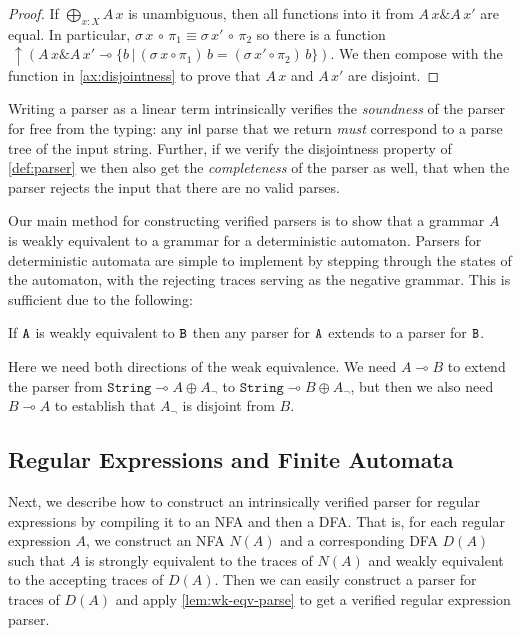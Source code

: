 \documentclass[acmsmall,nonacm]{acmart}
\newcommand{\inl}{\mathsf{inl}}
\newcommand{\lto}{\multimap}
\newcommand{\StringGram}{\texttt{String}}
\newcommand{\ltonl}[1]{~\uparrow #1}
\newcommand{\applto}[2]{#1 \, #2}
\newcommand{\LinSigTy}[3]{\textstyle\bigoplus_{#1 : #2} #3}
\newcommand{\equalizer}[3]{\{#1\,|\,\applto {#2}{#1} = \applto{#3}{#1} \}}
\newcommand{\agdalogo}{%
  \usebox{\logoagdabox}}%
\newcommand{\zenodolink}{https://zenodo.org/records/15049780}
\newcommand{\Agda}{\href{\zenodolink}{\agdalogo}}
\begin{document}
{\begin{proof}
If $\LinSigTy{x}{X}{A\,x}$ is unambiguous, then all functions into it from
$A\,x \& A\,x'$ are equal. In particular,
$\sigma\,x\,\circ\,\pi_{1} \equiv \sigma\,x'\,\circ\,\pi_{2}$ so there is a
function \(
\ltonl{\left(A\,x \& A\,x' \lto
  \equalizer{b}{\left( \sigma\,x \circ \pi_1 \right)}{\left(  \sigma\,x'\circ \pi_2 \right)}
\right)}.
\)
We then compose with the function in \cref{ax:disjointness} to prove that $A\,x$ and $A\,x'$ are disjoint.
\end{proof}

Writing a parser as a linear term intrinsically verifies the \emph{soundness} of
the parser for free from the typing: any $\inl$ parse that we return \emph{must}
correspond to a parse tree of the input string. Further, if we verify the
disjointness property of \cref{def:parser} we then also get the
\emph{completeness} of the parser as well, that when the parser rejects the
input that there are no valid parses.

Our main method for constructing verified parsers is to show that a
grammar $A$ is weakly equivalent to a grammar for a deterministic
automaton. Parsers for deterministic automata are simple to implement
by stepping through the states of the automaton, with the rejecting
traces serving as the negative grammar. This is sufficient due to the
following:
\begin{lemma}[\Agda]
  \label{lem:wk-eqv-parse}
  If $\texttt{A}$ is weakly equivalent to $\texttt{B}$ then any parser for $\texttt{A}$ extends to a
  parser for $\texttt{B}$.
\end{lemma}
Here we need both directions of the weak equivalence. We need $A \lto
B$ to extend the parser from $\StringGram \lto A \oplus A_{\neg}$ to
$\StringGram \lto B \oplus A_{\neg}$, but then we also need $B \lto A$ to
establish that $A_{\neg}$ is disjoint from $B$.

\subsection{Regular Expressions and Finite Automata}

Next, we describe how to construct an intrinsically
verified parser for regular expressions by compiling it to an NFA and
then a DFA. That is, for each regular expression $A$, we construct an
NFA $N(A)$ and a corresponding DFA $D(A)$ such that $A$ is strongly
equivalent to the traces of $N(A)$ and weakly equivalent to the
accepting traces of $D(A)$. Then we can easily construct a parser for
traces of $D(A)$ and apply \cref{lem:wk-eqv-parse} to get
a verified regular expression parser.

}
\end{document}
